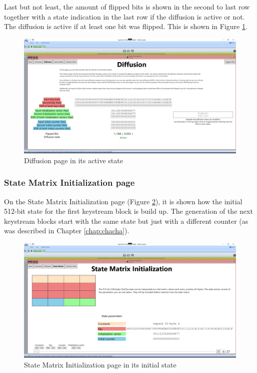 Last but not least, the amount of flipped bits is shown in the second to last row together with a state indication in the last row if the diffusion is active or not. The diffusion is active if at least one bit was flipped. This is shown in Figure \ref{fig:diffusion.active}.

\begin{figure}
\centering
\includegraphics[width=\textwidth]{figures/ct2/diffusion/diffusion-active.png}
\caption{Diffusion page in its active state}
\label{fig:diffusion.active}
\end{figure}

\subsubsection{State Matrix Initialization page}

On the State Matrix Initialization page (Figure \ref{fig:statematrixpage}), it is shown how the initial 512-bit state for the first keystream block is build up. The generation of the next keystream blocks start with the same state but just with a different counter (as was described in Chapter \ref{chap:chacha}).

\begin{figure}
\centering
\includegraphics[width=\textwidth]{figures/ct2/all-pages/4-statematrix.png}
\caption{State Matrix Initialization page in its initial state}
\label{fig:statematrixpage}
\end{figure}

